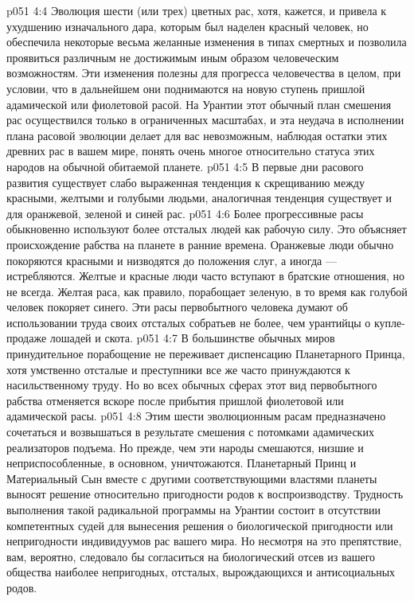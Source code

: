 \vs p051 4:4 Эволюция шести (или трех) цветных рас, хотя, кажется, и привела к ухудшению изначального дара, которым был наделен красный человек, но обеспечила некоторые весьма желанные изменения в типах смертных и позволила проявиться различным не достижимым иным образом человеческим возможностям. Эти изменения полезны для прогресса человечества в целом, при условии, что в дальнейшем они поднимаются на новую ступень пришлой адамической или фиолетовой расой. На Урантии этот обычный план смешения рас осуществился только в ограниченных масштабах, и эта неудача в исполнении плана расовой эволюции делает для вас невозможным, наблюдая остатки этих древних рас в вашем мире, понять очень многое относительно статуса этих народов на обычной обитаемой планете.
\vs p051 4:5 \pc В первые дни расового развития существует слабо выраженная тенденция к скрещиванию между красными, желтыми и голубыми людьми, аналогичная тенденция существует и для оранжевой, зеленой и синей рас.
\vs p051 4:6 Более прогрессивные расы обыкновенно используют более отсталых людей как рабочую силу. Это объясняет происхождение рабства на планете в ранние времена. Оранжевые люди обычно покоряются красными и низводятся до положения слуг, а иногда --- истребляются. Желтые и красные люди часто вступают в братские отношения, но не всегда. Желтая раса, как правило, порабощает зеленую, в то время как голубой человек покоряет синего. Эти расы первобытного человека думают об использовании труда своих отсталых собратьев не более, чем урантийцы о купле\hyp{}продаже лошадей и скота.
\vs p051 4:7 В большинстве обычных миров принудительное порабощение не переживает диспенсацию Планетарного Принца, хотя умственно отсталые и преступники все же часто принуждаются к насильственному труду. Но во всех обычных сферах этот вид первобытного рабства отменяется вскоре после прибытия пришлой фиолетовой или адамической расы.
\vs p051 4:8 Этим шести эволюционным расам предназначено сочетаться и возвышаться в результате смешения с потомками адамических реализаторов подъема. Но прежде, чем эти народы смешаются, низшие и неприспособленные, в основном, уничтожаются. Планетарный Принц и Материальный Сын вместе с другими соответствующими властями планеты выносят решение относительно пригодности родов к воспроизводству. Трудность выполнения такой радикальной программы на Урантии состоит в отсутствии компетентных судей для вынесения решения о биологической пригодности или непригодности индивидуумов рас вашего мира. Но несмотря на это препятствие, вам, вероятно, следовало бы согласиться на биологический отсев из вашего общества наиболее непригодных, отсталых, вырождающихся и антисоциальных родов.
